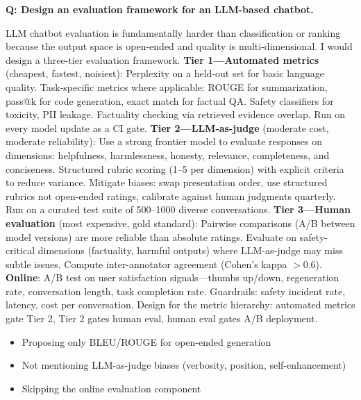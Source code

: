 \begin{interviewq}
\textbf{Q: Design an evaluation framework for an LLM-based chatbot.}

 \quad {} \quad \badgefreq{\freqmed}

\stronganswer LLM chatbot evaluation is fundamentally harder than classification or ranking because the output space is open-ended and quality is multi-dimensional. I would design a three-tier evaluation framework. \textbf{Tier 1---Automated metrics} (cheapest, fastest, noisiest): Perplexity on a held-out set for basic language quality. Task-specific metrics where applicable: ROUGE for summarization, pass@k for code generation, exact match for factual QA. Safety classifiers for toxicity, PII leakage. Factuality checking via retrieved evidence overlap. Run on every model update as a CI gate. \textbf{Tier 2---LLM-as-judge} (moderate cost, moderate reliability): Use a strong frontier model to evaluate responses on dimensions: helpfulness, harmlessness, honesty, relevance, completeness, and conciseness. Structured rubric scoring (1--5 per dimension) with explicit criteria to reduce variance. Mitigate biases: swap presentation order, use structured rubrics not open-ended ratings, calibrate against human judgments quarterly. Run on a curated test suite of 500--1000 diverse conversations. \textbf{Tier 3---Human evaluation} (most expensive, gold standard): Pairwise comparisons (A/B between model versions) are more reliable than absolute ratings. Evaluate on safety-critical dimensions (factuality, harmful outputs) where LLM-as-judge may miss subtle issues. Compute inter-annotator agreement (Cohen's kappa $> 0.6$). \textbf{Online}: A/B test on user satisfaction signals---thumbs up/down, regeneration rate, conversation length, task completion rate. Guardrails: safety incident rate, latency, cost per conversation. Design for the metric hierarchy: automated metrics gate Tier 2, Tier 2 gates human eval, human eval gates A/B deployment.

\redflags
\begin{itemize}
    \item Proposing only BLEU/ROUGE for open-ended generation
    \item Not mentioning LLM-as-judge biases (verbosity, position, self-enhancement)
    \item Skipping the online evaluation component
\end{itemize}



\end{interviewq}
